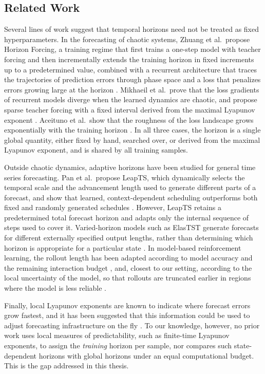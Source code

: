 \documentclass{article}
\begin{document}
\subsection{Related Work}

Several lines of work suggest that temporal horizons need not be treated as fixed hyperparameters. In the forecasting of chaotic systems, Zhuang et al.\ propose Horizon Forcing, a training regime that first trains a one-step model with teacher forcing and then incrementally extends the training horizon in fixed increments up to a predetermined value, combined with a recurrent architecture that traces the trajectories of prediction errors through phase space and a loss that penalizes errors growing large at the horizon \cite{zhuang_horizon_2025}. Mikhaeil et al.\ prove that the loss gradients of recurrent models diverge when the learned dynamics are chaotic, and propose sparse teacher forcing with a fixed interval derived from the maximal Lyapunov exponent \cite{mikhaeil_difficulty_2022}. Aceituno et al.\ show that the roughness of the loss landscape grows exponentially with the training horizon \cite{aceituno_temporal_2025}. In all three cases, the horizon is a single global quantity, either fixed by hand, searched over, or derived from the maximal Lyapunov exponent, and is shared by all training samples.

Outside chaotic dynamics, adaptive horizons have been studied for general time series forecasting. Pan et al.\ propose LeapTS, which dynamically selects the temporal scale and the advancement length used to generate different parts of a forecast, and show that learned, context-dependent scheduling outperforms both fixed and randomly generated schedules \cite{pan_leapts_2026}. However, LeapTS retains a predetermined total forecast horizon and adapts only the internal sequence of steps used to cover it. Varied-horizon models such as ElasTST generate forecasts for different externally specified output lengths, rather than determining which horizon is appropriate for a particular state \cite{zhang_elastst_2024}. In model-based reinforcement learning, the rollout length has been adapted according to model accuracy and the remaining interaction budget \cite{bhatia_adaptive_2022}, and, closest to our setting, according to the local uncertainty of the model, so that rollouts are truncated earlier in regions where the model is less reliable \cite{frauenknecht_trust_2024}.

Finally, local Lyapunov exponents are known to indicate where forecast errors grow fastest, and it has been suggested that this information could be used to adjust forecasting infrastructure on the fly \cite{ayers_supervised_2023}. To our knowledge, however, no prior work uses local measures of predictability, such as finite-time Lyapunov exponents, to assign the \emph{training} horizon per sample, nor compares such state-dependent horizons with global horizons under an equal computational budget. This is the gap addressed in this thesis.
\end{document}
